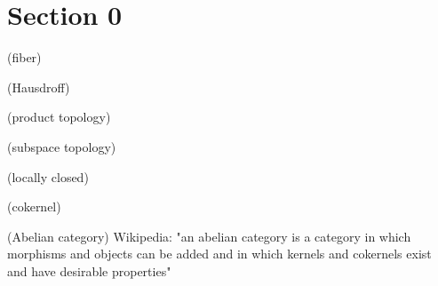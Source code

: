 \section*{Section 0}
\begin{definition*}
	(fiber)
\end{definition*}

\begin{definition*}
	(Hausdroff)
\end{definition*}

\begin{definition*}
	(product topology)
\end{definition*}

\begin{definition*}
	(subspace topology)
\end{definition*}

\begin{definition*}
	(locally closed)
\end{definition*}

\begin{definition*}
	(cokernel)
\end{definition*}

\begin{definition*}
	(Abelian category) Wikipedia: "an abelian category is a category in which morphisms and objects can be added and in which kernels and cokernels exist and have desirable properties"
\end{definition*}
